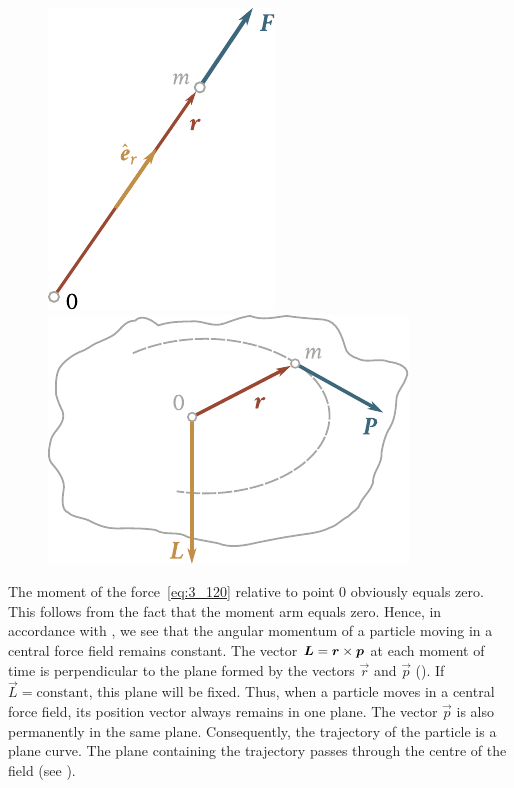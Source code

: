 \begin{figure}[t]
	\hspace{-0.5cm}
	\begin{minipage}[t]{0.5\linewidth}
		\begin{center}
			\includegraphics[scale=0.9]{figures/ch_03/fig_3_24.pdf}
			\caption[]{}
			\label{fig:3_24}
		\end{center}
	\end{minipage}
	\hspace{-0.5cm}
	\begin{minipage}[t]{0.5\linewidth}
		\begin{center}
			\includegraphics[scale=0.95]{figures/ch_03/fig_3_25.pdf}
			\caption[]{}
			\label{fig:3_25}
		\end{center}
	\end{minipage}
	\vspace{-0.3cm}
\end{figure}

The moment of the force~\eqref{eq:3_120} relative to point $0$ obviously equals zero. This follows from the fact that the moment arm equals zero. Hence, in accordance with , we see that the angular momentum of a particle moving in a central force field remains constant. The vector $\boldsymbol{L}=\boldsymbol{r}\times\boldsymbol{p}$ at each moment of time is perpendicular to the plane formed by the vectors $\vec{r}$ and $\vec{p}$ (). If $\vec{L}=\text{constant}$, this plane will be fixed. Thus, when a particle moves in a central force field, its position vector always remains in one plane. The vector $\vec{p}$ is also permanently in the same plane. Consequently, the trajectory of the particle is a plane curve. The plane containing the trajectory passes through the centre of the field (see ).

